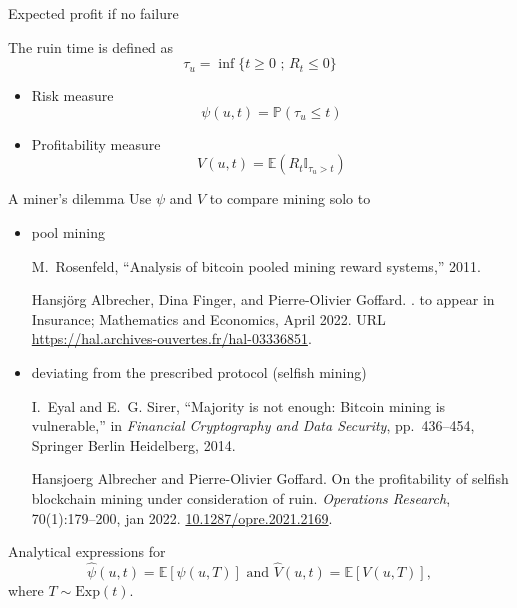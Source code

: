\documentclass{beamer}
\begin{document}
\begin{frame}{Expected profit if no failure}
\scriptsize

The ruin time is defined as
$$
\tau_u  = \inf\{t\geq0\text{ ; }R_t \leq0\}
$$
\begin{itemize}
  \item Risk measure
  $$
  \psi(u,t) = \mathbb{P}(\tau_u \leq t)
  $$
  \item Profitability measure
  $$
  V(u,t) = \mathbb{E}(R_t\mathbb{I}_{\tau_u > t})
  $$
\end{itemize} 
\end{frame}
\begin{frame}{A miner's dilemma} 
\scriptsize
Use $\psi$ and $V$ to compare mining solo to
\begin{itemize}
  \item pool mining
\tiny
  \begin{thebibliography}{1}

M.~Rosenfeld, ``Analysis of bitcoin pooled mining reward systems,'' 2011.

Hansj{\"o}rg Albrecher, Dina Finger, and Pierre-Olivier Goffard.
.
\newblock to appear in Insurance; Mathematics and Economics, April 2022.
\newblock URL \url{https://hal.archives-ouvertes.fr/hal-03336851}.


\end{thebibliography}
  \item \scriptsize deviating from the prescribed protocol (selfish mining)

  \tiny
  \begin{thebibliography}{1}
I.~Eyal and E.~G. Sirer, ``Majority is not enough: Bitcoin mining is
  vulnerable,'' in {\em Financial Cryptography and Data Security},
  pp.~436--454, Springer Berlin Heidelberg, 2014.

Hansjoerg Albrecher and Pierre-Olivier Goffard.
\newblock On the profitability of selfish blockchain mining under consideration
  of ruin.
\newblock \emph{Operations Research}, 70(1):179--200, jan
  2022.
\newblock \url{10.1287/opre.2021.2169}.
\end{thebibliography}
\end{itemize}
Analytical expressions for 
$$
\widehat{\psi}(u,t)= \mathbb{E}[\psi(u,T)]\text{ and }\widehat{V}(u,t)= \mathbb{E}[V(u,T)],
$$
where $T\sim\text{Exp}(t)$.
\end{frame}
\end{document}
